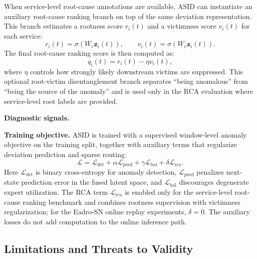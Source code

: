 When service-level root-cause annotations are available, ASID can instantiate an auxiliary root-cause ranking branch on top of the same deviation representation. This branch estimates a rootness score \(r_i(t)\) and a victimness score \(v_i(t)\) for each service:
\begin{equation}
r_i(t)=\sigma(W_r\mathbf{z}_i(t)), \qquad
v_i(t)=\sigma(W_v\mathbf{z}_i(t)).
\end{equation}
The final root-cause ranking score is then computed as:
\begin{equation}
q_i(t)=r_i(t)-\eta v_i(t),
\end{equation}
where \(\eta\) controls how strongly likely downstream victims are suppressed. This optional root-victim disentanglement branch separates ``being anomalous'' from ``being the source of the anomaly'' and is used only in the RCA evaluation where service-level root labels are provided.

\textbf{Diagnostic signals.}

\textbf{Training objective.}
ASID is trained with a supervised window-level anomaly objective on the training split, together with auxiliary terms that regularize deviation prediction and sparse routing:
\begin{equation}
\mathcal{L}
= \mathcal{L}_{\mathrm{det}}
+ \alpha \mathcal{L}_{\mathrm{pred}}
+ \gamma \mathcal{L}_{\mathrm{bal}}
+ \delta \mathcal{L}_{\mathrm{rca}}.
\end{equation}
Here \(\mathcal{L}_{\mathrm{det}}\) is binary cross-entropy for anomaly detection, \(\mathcal{L}_{\mathrm{pred}}\) penalizes next-state prediction error in the fused latent space, and \(\mathcal{L}_{\mathrm{bal}}\) discourages degenerate expert utilization. The RCA term \(\mathcal{L}_{\mathrm{rca}}\) is enabled only for the service-level root-cause ranking benchmark and combines rootness supervision with victimness regularization; for the Eadro-SN online replay experiments, \(\delta=0\). The auxiliary losses do not add computation to the online inference path.

\subsection{Limitations and Threats to Validity}

